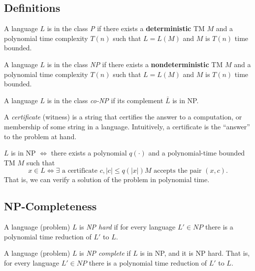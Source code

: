 \subsection{Definitions}
\begin{definition}[P]
  A language $L$ is in the class \textit{P} if there exists a
  \textbf{deterministic} TM $M$ and a polynomial time complexity $T(n)$ such
  that $L=L(M)$ and $M$ is $T(n)$ time bounded.
\end{definition}

\begin{definition}[NP]
  A language $L$ is in the class \textit{NP} if there exists a
  \textbf{nondeterministic} TM $M$ and a polynomial time complexity $T(n)$ such
  that $L=L(M)$ and $M$ is $T(n)$ time bounded.
\end{definition}

\begin{definition}[co-NP]
  A language $L$ is in the class \textit{co-NP} if its complement $\bar{L}$ is
  in NP.
\end{definition}

\begin{definition}[Certificate]
  A \textit{certificate} (witness) is a string that certifies the answer to a
  computation, or membership of some string in a language. Intuitively, a
  certificate is the ``answer'' to the problem at hand.
\end{definition}
\begin{prop}
  $L$ is in NP $\iff$ there exists a polynomial $q\left( \cdot \right) $ and a
  polynomial-time bounded TM $M$ such that 
  \[x\in L \iff \exists \text{ a certificate } c, \left| c \right| \le
  q\left(\left| x \right| \right) \text{$M$ accepts the pair $\left( x,c
\right) $}.\]
  That is, we can verify a solution of the problem in polynomial time.
\end{prop}

\subsection{NP-Completeness}
\begin{definition}[NP Hard]
  A language (problem) $L$ is \textit{NP hard} if for every language $L'\in
  NP$ there is a polynomial time reduction of $L'$ to $L$.
\end{definition}

\begin{definition}[NP Complete]
  A language (problem) $L$ is \textit{NP complete} if $L$ is in NP, and it is
  NP hard. That is, for every language $L'\in NP$ there is a polynomial time
  reduction of $L'$ to $L$.
\end{definition}

